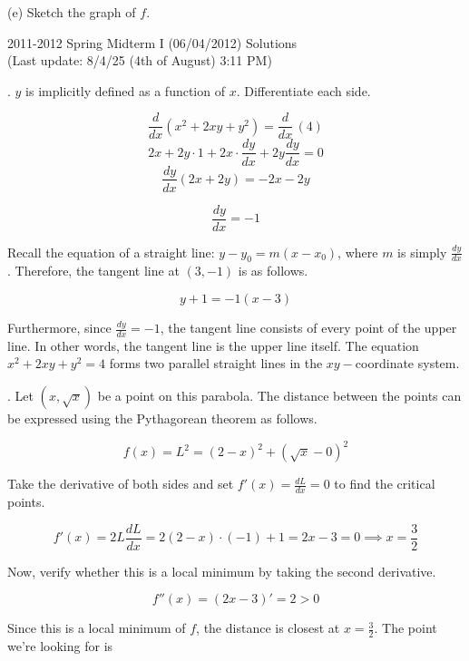 \documentclass{article}
\begin{document}
\hfill

(e) Sketch the graph of $f$.

\newpage

\begin{center}
2011-2012 Spring Midterm I (06/04/2012) Solutions\\
(Last update: 8/4/25 (4th of August) 3:11 PM)
\end{center}

. $y$ is implicitly defined as a function of $x$. Differentiate each side.

\[\frac{d}{dx}\left(x^2+2xy+y^2\right)=\frac{d}{dx}\,(4)\]
\[2x+2y\cdot1+2x\cdot\frac{dy}{dx}+2y\frac{dy}{dx}=0\]
\[\frac{dy}{dx}(2x+2y)=-2x-2y\]

\[\frac{dy}{dx}=-1\]

\hfill

\noindent Recall the equation of a straight line: $y-y_0=m(x-x_0)$, where $m$ is simply $\displaystyle \frac{dy}{dx}$. Therefore, the tangent line at $(3,-1)$ is as follows.

\[\boxed{y+1=-1(x-3)}\]

\hfill

\noindent Furthermore, since $\displaystyle \frac{dy}{dx}=-1$, the tangent line consists of every point of the upper line. In other words, the tangent line is the upper line itself. The equation $x^2+2xy+y^2=4$ forms two parallel straight lines in the $xy-$coordinate system.

\hfill

. Let $(x,\sqrt x)$ be a point on this parabola. The distance between the points can be expressed using the Pythagorean theorem as follows.

\[f(x)=L^2=(2-x)^2 + (\sqrt x - 0)^2\]

\hfill

\noindent Take the derivative of both sides and set $\displaystyle f'(x)=\frac{dL}{dx} = 0$ to find the critical points.

\begin{equation*}
f'(x)=2L\frac{dL}{dx}=2(2-x)\cdot(-1) + 1 = 2x-3=0 \implies x=\frac{3}2
\end{equation*}

\hfill

\noindent Now, verify whether this is a local minimum by taking the second derivative.

\[f''(x)=(2x-3)'=2>0\]

\noindent Since this is a local minimum of $f$, the distance is closest at $\displaystyle x=\frac32$. The point we're looking for is
\end{document}
